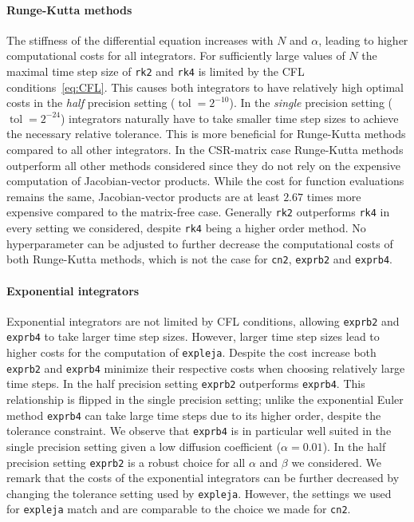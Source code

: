 \documentclass{scrartcl}
\begin{document}
	\paragraph{Runge-Kutta methods}
	The stiffness of the differential equation increases with $N$ and $\alpha$, leading to higher computational costs for all integrators. For sufficiently large values of $N$ the maximal time step size of \texttt{rk2} and \texttt{rk4} is limited by the CFL conditions~\ref{eq:CFL}. This causes both integrators to have relatively high optimal costs in the \textit{half} precision setting ($\operatorname{tol}=2^{-10}$). In the \textit{single} precision setting ($\operatorname{tol}=2^{-24}$) integrators naturally have to take smaller time step sizes to achieve the necessary relative tolerance. This is more beneficial for Runge-Kutta methods compared to all other integrators. In the CSR-matrix case Runge-Kutta methods outperform all other methods considered since they do not rely on the expensive computation of Jacobian-vector products. While the cost for function evaluations remains the same, Jacobian-vector products are at least $2.67$ times more expensive compared to the matrix-free case. Generally \texttt{rk2} outperforms \texttt{rk4} in every setting we considered, despite \texttt{rk4} being a higher order method. No hyperparameter can be adjusted to further decrease the computational costs of both Runge-Kutta methods, which is not the case for \texttt{cn2}, \texttt{exprb2} and \texttt{exprb4}.
	
	\paragraph{Exponential integrators}
	Exponential integrators are not limited by CFL conditions, allowing \texttt{exprb2} and \texttt{exprb4} to take larger time step sizes. However, larger time step sizes lead to higher costs for the computation of \texttt{expleja}. Despite the cost increase both \texttt{exprb2} and \texttt{exprb4} minimize their respective costs when choosing relatively large time steps. In the half precision setting \texttt{exprb2} outperforms \texttt{exprb4}. This relationship is flipped in the single precision setting; unlike the exponential Euler method \texttt{exprb4} can take large time steps due to its higher order, despite the tolerance constraint. We observe that \texttt{exprb4} is in particular well suited in the single precision setting given a low diffusion coefficient ($\alpha = 0.01$). In the half precision setting \texttt{exprb2} is a robust choice for all $\alpha$ and $\beta$ we considered. We remark that the costs of the exponential integrators can be further decreased by changing the tolerance setting used by \texttt{expleja}. However, the settings we used for \texttt{expleja} match \cite{lejarev} and are comparable to the choice we made for \texttt{cn2}. 
	
\end{document}
